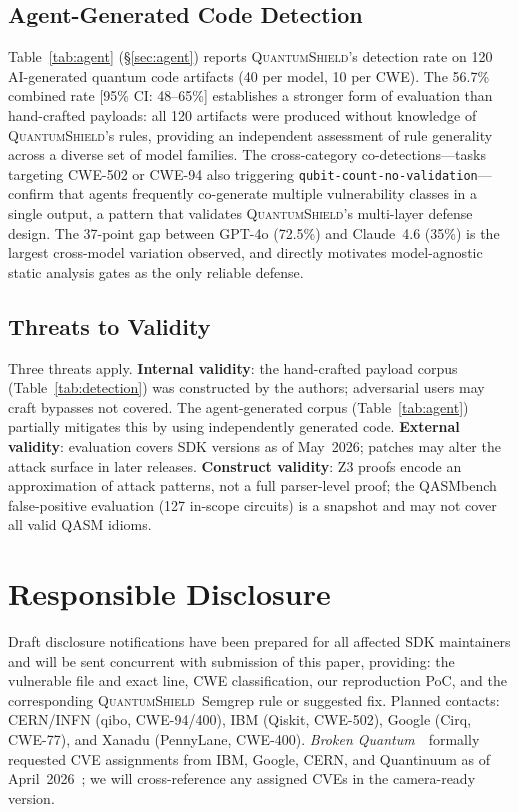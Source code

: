 \documentclass[conference,compsoc]{IEEEtran}
\newcommand{\tool}{\textsc{QuantumShield}}
\newcommand{\broken}{\textit{Broken Quantum}~\cite{blain2026broken}}
\begin{document}
\subsection{Agent-Generated Code Detection}
\label{sec:eval_agent}
\noindent Table~\ref{tab:agent} (\S\ref{sec:agent}) reports \tool's detection rate
on 120 AI-generated quantum code artifacts (40 per model, 10 per CWE).
The 56.7\% combined rate [95\% CI: 48--65\%] establishes a stronger
form of evaluation than hand-crafted payloads: all 120 artifacts were
produced without knowledge of \tool's rules, providing an independent
assessment of rule generality across a diverse set of model families.
The cross-category co-detections---tasks targeting CWE-502 or CWE-94
also triggering \texttt{qubit-count-no-validation}---confirm that agents
frequently co-generate multiple vulnerability classes in a single output,
a pattern that validates \tool's multi-layer defense design.
The 37-point gap between GPT-4o (72.5\%) and Claude~4.6 (35\%) is the
largest cross-model variation observed, and directly motivates
model-agnostic static analysis gates as the only reliable defense.

\subsection{Threats to Validity}
\noindent Three threats apply.
\textbf{Internal validity}: the hand-crafted payload corpus
(Table~\ref{tab:detection}) was constructed by the authors;
adversarial users may craft bypasses not covered.
The agent-generated corpus (Table~\ref{tab:agent}) partially
mitigates this by using independently generated code.
\textbf{External validity}: evaluation covers SDK versions as of
May~2026; patches may alter the attack surface in later releases.
\textbf{Construct validity}: Z3 proofs encode an approximation of
attack patterns, not a full parser-level proof;
the QASMbench false-positive evaluation (127 in-scope circuits) is a
snapshot and may not cover all valid QASM idioms.

\FloatBarrier
\section{Responsible Disclosure}
\label{sec:disclosure}
\noindent Draft disclosure notifications have been prepared for all affected
SDK maintainers and will be sent concurrent with submission of this
paper, providing: the vulnerable file and exact line, CWE
classification, our reproduction PoC, and the corresponding
\tool\ Semgrep rule or suggested fix.
Planned contacts: CERN/INFN (qibo, CWE-94/400), IBM (Qiskit, CWE-502),
Google (Cirq, CWE-77), and Xanadu (PennyLane, CWE-400).
\broken\ formally requested CVE assignments from IBM, Google, CERN,
and Quantinuum as of April~2026~\cite{blain2026broken}; we will
cross-reference any assigned CVEs in the camera-ready version.
\end{document}
